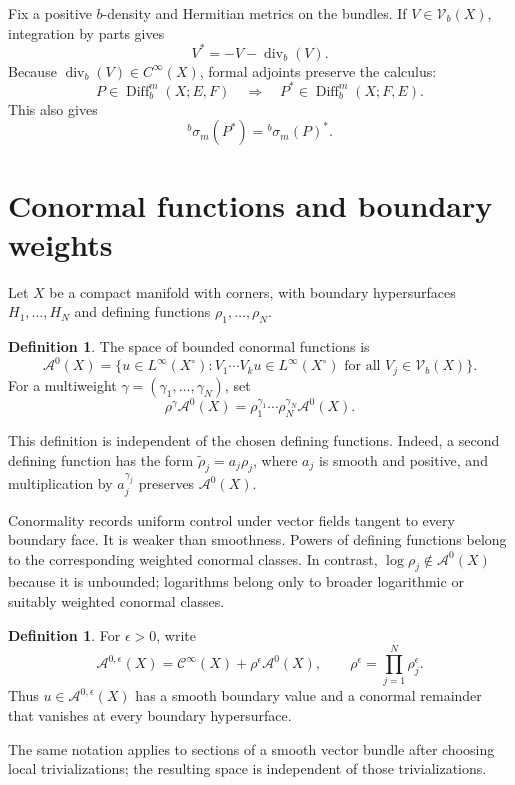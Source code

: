 \documentclass[12pt,oneside,reqno]{article}
\theoremstyle{plain}
\theoremstyle{definition}
\newtheorem{definition}[theorem]{Definition}
\theoremstyle{remark}
\begin{document}
Fix a positive $b$-density and Hermitian metrics on the bundles. If
$V\in\mathcal V_b(X)$, integration by parts gives
\[
 V^*=-V-\operatorname{div}_b(V).
\]
Because $\operatorname{div}_b(V)\in C^\infty(X)$, formal adjoints
preserve the calculus:
\[
 P\in\operatorname{Diff}_b^m(X;E,F)
 \quad\Longrightarrow\quad
 P^*\in\operatorname{Diff}_b^m(X;F,E).
\]
This also gives
\[
 {}^b\sigma_m(P^*)={}^b\sigma_m(P)^*.
\]
\section{Conormal functions and boundary weights}

Let \(X\) be a compact manifold with corners, with boundary hypersurfaces
\(H_1,\ldots,H_N\) and defining functions
\(\rho_1,\ldots,\rho_N\).

\begin{definition}
The space of bounded conormal functions is
\[
 \mathcal A^0(X)
 =
 \{u\in L^\infty(X^\circ):V_1\cdots V_k u\in L^\infty(X^\circ)
 \text{ for all }V_j\in\mathcal V_b(X)\}.
\]
For a multiweight \(\gamma=(\gamma_1,\ldots,\gamma_N)\), set
\[
 \rho^\gamma\mathcal A^0(X)
 =
 \rho_1^{\gamma_1}\cdots\rho_N^{\gamma_N}\mathcal A^0(X).
\]
\end{definition}

This definition is independent of the chosen defining functions. Indeed, a
second defining function has the form \(\widetilde\rho_j=a_j\rho_j\), where
\(a_j\) is smooth and positive, and multiplication by \(a_j^{\gamma_j}\)
preserves \(\mathcal A^0(X)\).

Conormality records uniform control under vector fields tangent to every
boundary face. It is weaker than smoothness. Powers of defining functions
belong to the corresponding weighted conormal classes. In contrast,
\(\log\rho_j\notin\mathcal A^0(X)\) because it is unbounded; logarithms
belong only to broader logarithmic or suitably weighted conormal classes.

\begin{definition}
For \(\epsilon>0\), write
\[
 \mathcal A^{0,\epsilon}(X)
 =
 \mathcal C^\infty(X)+\rho^\epsilon\mathcal A^0(X),
 \qquad
 \rho^\epsilon=\prod_{j=1}^N\rho_j^\epsilon.
\]
Thus \(u\in\mathcal A^{0,\epsilon}(X)\) has a smooth boundary value and a
conormal remainder that vanishes at every boundary hypersurface.
\end{definition}

The same notation applies to sections of a smooth vector bundle after
choosing local trivializations; the resulting space is independent of those
trivializations.
\end{document}
